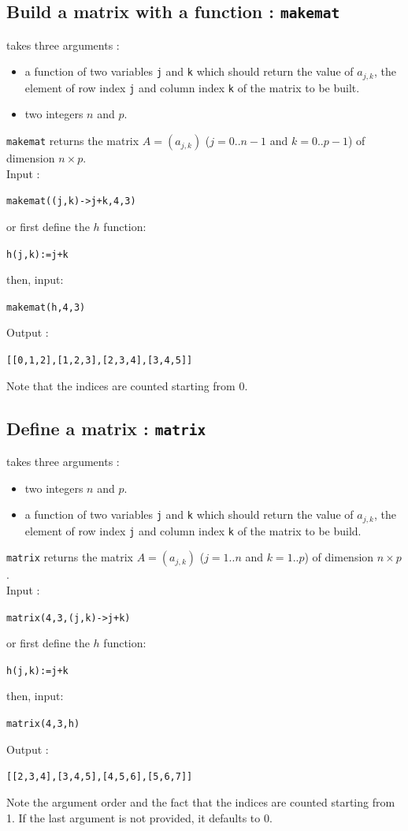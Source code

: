 \documentclass[a4paper,11pt]{book}
\begin{document}
\subsection{Build a matrix with a function : {\tt makemat}}
 takes three arguments : 
\begin{itemize}
\item a function of two variables {\tt j} and {\tt k} which
should return the value of $a_{j,k}$, the element of
row index {\tt j} and column index {\tt k} of the matrix to be built.
\item two integers $n$ and $p$.
\end{itemize}
{\tt makemat} returns the matrix $A=(a_{j,k})$ 
($j=0..n-1$ and $k=0..p-1$) of dimension $n \times p$.\\
Input :
\begin{center}{\tt makemat((j,k)->j+k,4,3)}\end{center}
or first define the  $h$ function:
\begin{center}{\tt h(j,k):=j+k}\end{center}
then, input:
\begin{center}{\tt makemat(h,4,3)}\end{center}
Output :
\begin{center}{\tt [[0,1,2],[1,2,3],[2,3,4],[3,4,5]]}\end{center}
Note that the indices are counted starting from 0.

\subsection{Define a matrix : {\tt matrix}}
 takes three arguments :
\begin{itemize}
\item  two integers $n$ and $p$.  
\item  a function of two variables {\tt j} and {\tt k} which
should return the value of $a_{j,k}$, the element of
row index {\tt j} and column index {\tt k} of the matrix to be build.
\end{itemize}
{\tt matrix} returns the matrix $A=(a_{j,k})$ ($j=1..n$ and $k=1..p$) of 
dimension $n \times p$.\\
Input :
\begin{center}{\tt matrix(4,3,(j,k)->j+k)}\end{center}
or first define the $h$ function:
\begin{center} {\tt h(j,k):=j+k}\end{center}
then, input:
\begin{center}{\tt matrix(4,3,h)}\end{center}
Output :
\begin{center}{\tt [[2,3,4],[3,4,5],[4,5,6],[5,6,7]]}\end{center}
Note the argument order and the fact that the indices are counted
starting from 1. If the last argument is not provided, it defaults to 0.
\end{document}
